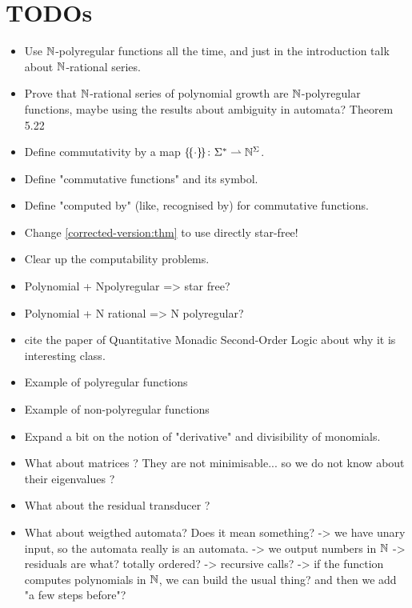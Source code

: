\documentclass[sigconf,natbib=false,screen, review,anonymous]{acmart}
\begin{document}
\maketitle
\acknowledge

\section{TODOs}

\begin{itemize}
    \item Use $\mathbb{N}$-polyregular functions all the time, and just 
        in the introduction talk about $\mathbb{N}$-rational series.
    \item Prove that $\mathbb{N}$-rational series of polynomial 
        growth are $\mathbb{N}$-polyregular functions, maybe using
        the results about ambiguity in automata?
        Theorem 5.22
    \item Define commutativity by a map 
        $\commute \colon \Sigma^* \topartial \Nat^{\Sigma}$.
    \item Define "commutative functions" and its symbol.
    \item Define "computed by" (like, recognised by) for commutative 
        functions.
    \item Change \cref{corrected-version:thm} to use directly
        star-free!
    \item Clear up the computability problems.
    \item Polynomial + Npolyregular => star free?
    \item Polynomial + N rational => N polyregular?
    \item cite the paper of Quantitative Monadic Second-Order Logic
        about why it is interesting class.
    \item Example of polyregular functions
    \item Example of non-polyregular functions
    \item Expand a bit on the notion of "derivative"
        and divisibility of monomials.
    \item What about matrices ? They are not minimisable... so we do not know
        about their eigenvalues ?
    \item What about the residual transducer ?
    \item What about weigthed automata? Does it mean something?
        -> we have unary input, so the automata really is an automata.
        -> we output numbers in $\mathbb{N}$
        -> residuals are what? totally ordered?
        -> recursive calls?
        -> if the function computes polynomials in $\mathbb{N}$, we can build
        the usual thing? and then we add "a few steps before"?


\end{itemize}
\end{document}

